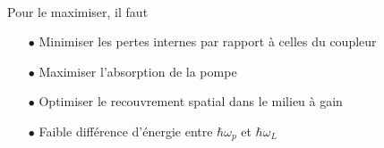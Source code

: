 \ \\

Pour le maximiser, il faut
\begin{itemize}
\item[$\bullet$] Minimiser les pertes internes par rapport à celles du coupleur
\item[$\bullet$] Maximiser l'absorption de la pompe
\item[$\bullet$] Optimiser le recouvrement spatial dans le milieu à gain
\item[$\bullet$] Faible différence d'énergie entre $\hbar\omega_p$ et $\hbar\omega_L$
\end{itemize}















